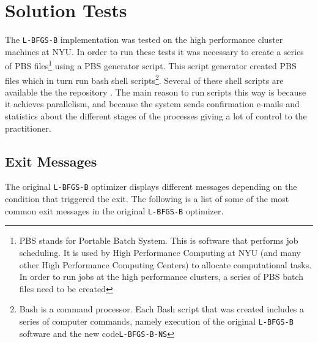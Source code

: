 \chapter{Solution Tests}

The \texttt{L-BFGS-B} implementation was tested on the high performance cluster machines at NYU. In order to run these tests it was necessary to create a series of PBS files\footnote{PBS stands for Portable Batch System. This is software that performs job scheduling. It is used by High Performance Computing at NYU (and many other High Performance Computing Centers) to allocate computational tasks. In order to run jobs at the high performance clusters, a series of PBS batch files need to be created} using a PBS generator script. This script generator created PBS files which in turn run bash shell scripts\footnote{Bash is a command processor. Each Bash script that was created includes a series of computer commands, namely execution of the original \texttt{L-BFGS-B} software and the new code\texttt{L-BFGS-B-NS}}. Several of these shell scripts are available the the repository \citep{lbfgsbNS}. The main reason to run scripts this way is because it achieves parallelism, and because the system sends confirmation e-mails and statistics about the different stages of the processes giving a lot of control to the practitioner.

\section{Exit Messages}

The original \texttt{L-BFGS-B} optimizer displays different messages depending on the condition that triggered the exit. The following is a list of some of the most common exit messages in the original \texttt{L-BFGS-B} optimizer.

